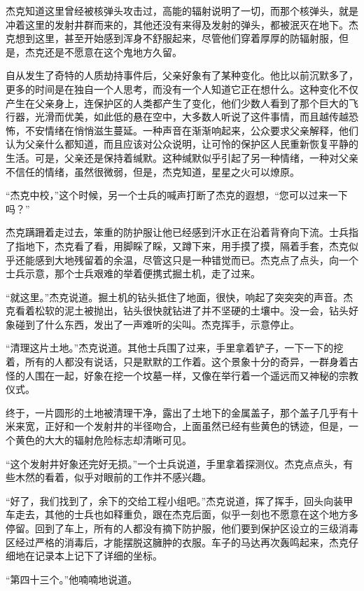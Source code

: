 杰克知道这里曾经被核弹头攻击过，高能的辐射说明了一切，而那个核弹头，就是冲着这里的发射井群而来的，其他还没有来得及发射的弹头，都被泯灭在地下。杰克想到这里，甚至开始感到浑身不舒服起来，尽管他们穿着厚厚的防辐射服，但是，杰克还是不愿意在这个鬼地方久留。

自从发生了奇特的人质劫持事件后，父亲好象有了某种变化。他比以前沉默多了，更多的时间是在独自一个人思考，而没有一个人知道它正在想什么。这种变化不仅产生在父亲身上，连保护区的人类都产生了变化，他们少数人看到了那个巨大的飞行器，光滑而优美，如此低的悬在空中，大多数人听说了这件事情，而且越传越恐怖，不安情绪在悄悄滋生蔓延。一种声音在渐渐响起来，公众要求父亲解释，他们认为父亲什么都知道，而且应该对公众说明，让可怜的保护区人民重新恢复平静的生活。可是，父亲还是保持着缄默。这种缄默似乎引起了另一种情绪，一种对父亲不信任的情绪，虽然很微弱，但是，杰克知道，星星之火可以燎原。

“杰克中校，”这个时候，另一个士兵的喊声打断了杰克的遐想，“您可以过来一下吗？”

杰克蹒跚着走过去，笨重的防护服让他已经感到汗水正在沿着背脊向下流。士兵指了指地下，杰克看了看，用脚睬了睬，又蹲下来，用手摸了摸，隔着手套，杰克似乎还能感到大地残留着的余温，尽管这只是一种错觉而已。杰克点了点头，向一个士兵示意，那个士兵艰难的举着便携式掘土机，走了过来。

“就这里。”杰克说道。掘土机的钻头抵住了地面，很快，响起了突突突的声音。杰克看着松软的泥土被抛出，钻头很快就钻进了并不坚硬的土壤中。没一会，钻头好象碰到了什么东西，发出了一声难听的尖叫。杰克挥手，示意停止。

“清理这片土地。”杰克说道。其他士兵围了过来，手里拿着铲子，一下一下的挖着，所有的人都没有说话，只是默默的工作着。这个景象十分的奇异，一群身着古怪的人围在一起，好象在挖一个坟墓一样，又像在举行着一个遥远而又神秘的宗教仪式。

终于，一片圆形的土地被清理干净，露出了土地下的金属盖子，那个盖子几乎有十米来宽，正好和一个发射井的半径吻合，上面虽然已经有些黄色的锈迹，但是，一个黄色的大大的辐射危险标志却清晰可见。

“这个发射井好象还完好无损。”一个士兵说道，手里拿着探测仪。杰克点点头，有些木然的看着，似乎对眼前的工作并不感兴趣。

“好了，我们找到了，余下的交给工程小组吧。”杰克说道，挥了挥手，回头向装甲车走去，其他的士兵也如释重负，跟在杰克后面，似乎一刻也不愿意在这个地方多停留。回到了车上，所有的人都没有摘下防护服，他们要到保护区设立的三级消毒区经过严格的消毒后，才能摆脱这臃肿的衣服。车子的马达再次轰鸣起来，杰克仔细地在记录本上记下了详细的坐标。

“第四十三个。”他喃喃地说道。

